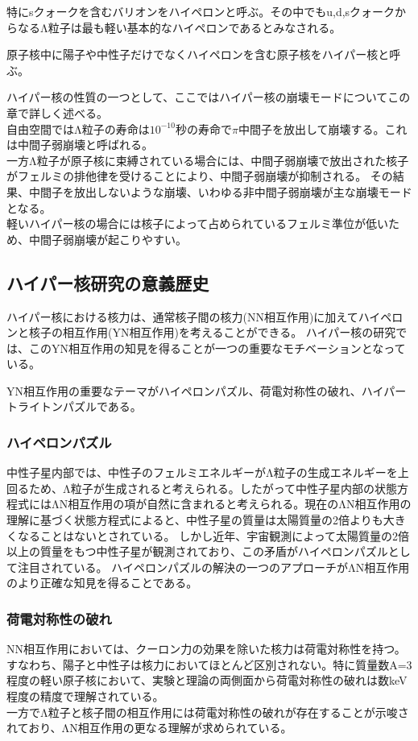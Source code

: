 \documentclass[a4paper,11pt,uplatex]{jsbook}
\begin{document}
特にsクォークを含むバリオンをハイペロンと呼ぶ。その中でもu,d,sクォークからなるΛ粒子は最も軽い基本的なハイペロンであるとみなされる。

原子核中に陽子や中性子だけでなくハイペロンを含む原子核をハイパー核と呼ぶ。

ハイパー核の性質の一つとして、ここではハイパー核の崩壊モードについてこの章で詳しく述べる。\\
自由空間ではΛ粒子の寿命は$10^{-10}$秒の寿命で$\pi$中間子を放出して崩壊する。これは中間子弱崩壊と呼ばれる。\\
一方Λ粒子が原子核に束縛されている場合には、中間子弱崩壊で放出された核子がフェルミの排他律を受けることにより、中間子弱崩壊が抑制される。
その結果、中間子を放出しないような崩壊、いわゆる非中間子弱崩壊が主な崩壊モードとなる。\\
軽いハイパー核の場合には核子によって占められているフェルミ準位が低いため、中間子弱崩壊が起こりやすい。\\

\subsection{ハイパー核研究の意義歴史}
ハイパー核における核力は、通常核子間の核力(NN相互作用)に加えてハイペロンと核子の相互作用(YN相互作用)を考えることができる。
ハイパー核の研究では、このYN相互作用の知見を得ることが一つの重要なモチベーションとなっている。

YN相互作用の重要なテーマがハイペロンパズル、荷電対称性の破れ、ハイパートライトンパズルである。
\subsubsection{ハイペロンパズル}
中性子星内部では、中性子のフェルミエネルギーがΛ粒子の生成エネルギーを上回るため、Λ粒子が生成されると考えられる。したがって中性子星内部の状態方程式にはΛN相互作用の項が自然に含まれると考えられる。現在のΛN相互作用の理解に基づく状態方程式によると、中性子星の質量は太陽質量の2倍よりも大きくなることはないとされている。
しかし近年、宇宙観測によって太陽質量の2倍以上の質量をもつ中性子星が観測されており、この矛盾がハイペロンパズルとして注目されている。
ハイペロンパズルの解決の一つのアプローチがΛN相互作用のより正確な知見を得ることである。
\subsubsection{荷電対称性の破れ}
NN相互作用においては、クーロン力の効果を除いた核力は荷電対称性を持つ。すなわち、陽子と中性子は核力においてほとんど区別されない。特に質量数A=3程度の軽い原子核において、実験と理論の両側面から荷電対称性の破れは数keV程度の精度で理解されている。\\
一方でΛ粒子と核子間の相互作用には荷電対称性の破れが存在することが示唆されており、ΛN相互作用の更なる理解が求められている。
\end{document}
